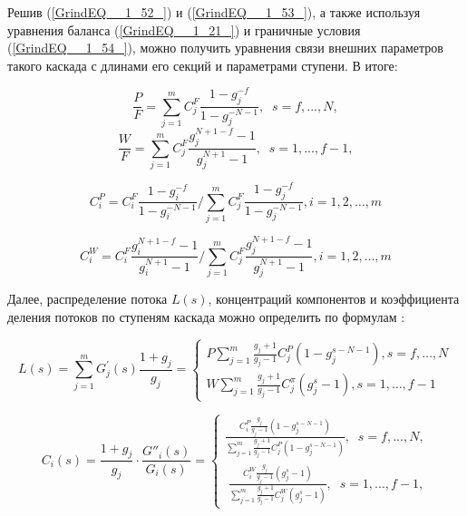 Решив (\ref{GrindEQ__1_52_}) и (\ref{GrindEQ__1_53_}), а также используя уравнения баланса (\ref{GrindEQ__1_21_}) и граничные условия (\ref{GrindEQ__1_54_}), можно получить уравнения связи внешних параметров такого каскада с длинами его секций и параметрами ступени. В итоге:

\begin{equation} \label{GrindEQ__1_55_} 
  \frac{P}{F} =\sum _{j=1}^{m}C_{j}^{F} \frac{1-g_{j}^{-f} }{1-g_{j}^{-N-1}} ,\; \; s=f,...,N ,                                                  
  \end{equation} 
  \begin{equation} \label{GrindEQ__1_56_} 
  \frac{W}{F} =\sum _{j=1}^{m}C_{j}^{F} \frac{g_{j}^{N+1-f} -1}{g_{j}^{N+1} -1} ,\; \; s=1,...,f-1 ,                                            
\end{equation}

\begin{equation} \label{GrindEQ__1_57_} 
  C_{i}^{P}=C_{i}^{F} \frac{1-g_{i}^{-f}}{1-g_{i}^{-N-1}} / \sum_{j=1}^{m} C_{j}^{F} \frac{1-g_{j}^{-f}}{1-g_{j}^{-N-1}}, i=1,2, \ldots, m                             
\end{equation}

\begin{equation} \label{GrindEQ__1_58_} 
  C_{i}^{W}=C_{i}^{F} \frac{g_{i}^{N+1-f}-1}{g_{i}^{N+1}-1} / \sum_{j=1}^{m} C_{j}^{F} \frac{g_{j}^{N+1-f}-1}{g_{j}^{N+1}-1}, i=1,2, \ldots, m                         
\end{equation} 

Далее, распределение потока $L(s)$, концентраций компонентов и коэффициента деления потоков по ступеням каскада можно определить по формулам \cite{sulaberidzeTeoriyaKaskadovDlya2011}:

\begin{equation} \label{GrindEQ__1_59_} 
L(s)=\sum_{j=1}^{m} G_{j}^{\prime}(s) \frac{1+g_{j}}{g_{j}}=\left\{\begin{array}{c}
  P \sum_{j=1}^{m} \frac{g_{j}+1}{g_{j}-1} C_{j}^{P}\left(1-g_{j}^{s-N-1}\right), s=f, \ldots, N \\
  W \sum_{j=1}^{m} \frac{g_{j}+1}{g_{j}-1} C_{j}^{\pi}\left(g_{j}^{s}-1\right), s=1, \ldots, f-1
  \end{array}\right.
\end{equation} 

\begin{equation} \label{GrindEQ__1_60_} 
C_{i} (s)=\frac{1+g_{j} }{g_{j} } \cdot \frac{G''_{i} (s)}{G_{i} (s)} =\left\{\begin{array}{l} {\frac{C_{i}^{P} \frac{g_{j} }{g_{j} -1} \left(1-g_{j}^{s-N-1} \right)}{\sum _{j=1}^{m}\frac{g_{j} +1}{g_{j} -1}  C_{j}^{P} \left(1-g_{j}^{s-N-1} \right)} ,\; \; s=f,...,N,} \\ {\; \frac{C_{i}^{W} \frac{g_{j} }{g_{j} -1} \left(g_{j}^{s} -1\right)}{\sum _{j=1}^{m}\frac{g_{j} +1}{g_{j} -1}  C_{j}^{W} \left(g_{j}^{s} -1\right)} ,\; \; s=1,...,f-1,} \end{array}\right.  
\end{equation} 

